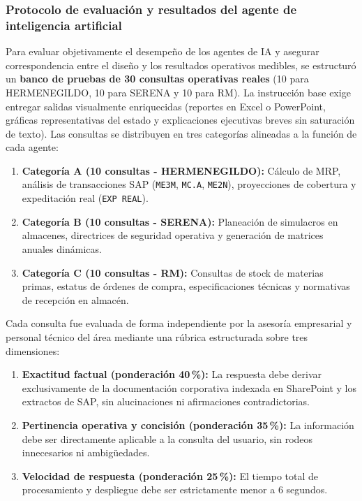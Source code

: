 \subsubsection{Protocolo de evaluación y resultados del agente de inteligencia artificial}

Para evaluar objetivamente el desempeño de los agentes de IA y asegurar correspondencia entre el diseño y los resultados operativos medibles, se estructuró un \textbf{banco de pruebas de 30 consultas operativas reales} (10 para HERMENEGILDO, 10 para SERENA y 10 para RM). La instrucción base exige entregar salidas visualmente enriquecidas (reportes en Excel o PowerPoint, gráficas representativas del estado y explicaciones ejecutivas breves sin saturación de texto). Las consultas se distribuyen en tres categorías alineadas a la función de cada agente:
\begin{enumerate}
    \item \textbf{Categoría A (10 consultas - HERMENEGILDO):} Cálculo de MRP, análisis de transacciones SAP (\texttt{ME3M}, \texttt{MC.A}, \texttt{ME2N}), proyecciones de cobertura y expeditación real (\texttt{EXP REAL}).
    \item \textbf{Categoría B (10 consultas - SERENA):} Planeación de simulacros en almacenes, directrices de seguridad operativa y generación de matrices anuales dinámicas.
    \item \textbf{Categoría C (10 consultas - RM):} Consultas de stock de materias primas, estatus de órdenes de compra, especificaciones técnicas y normativas de recepción en almacén.
\end{enumerate}

Cada consulta fue evaluada de forma independiente por la asesoría empresarial y personal técnico del área mediante una rúbrica estructurada sobre tres dimensiones:
\begin{enumerate}
    \item \textbf{Exactitud factual (ponderación 40\,\%):} La respuesta debe derivar exclusivamente de la documentación corporativa indexada en SharePoint y los extractos de SAP, sin alucinaciones ni afirmaciones contradictorias.
    \item \textbf{Pertinencia operativa y concisión (ponderación 35\,\%):} La información debe ser directamente aplicable a la consulta del usuario, sin rodeos innecesarios ni ambigüedades.
    \item \textbf{Velocidad de respuesta (ponderación 25\,\%):} El tiempo total de procesamiento y despliegue debe ser estrictamente menor a 6 segundos.
\end{enumerate}


